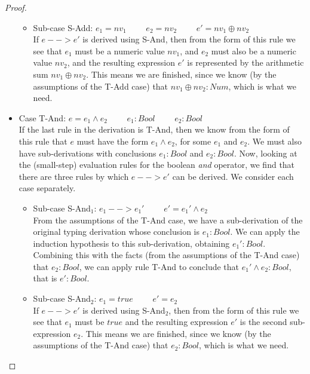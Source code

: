 \documentclass[tese,capa,english]{texufpel}
\begin{document}
\begin{proof}
\begin{itemize}
\begin{itemize}
\item Sub-case {\footnotesize\textrm{S-Add}}: $e_1 = nv_1$ \ \ \ \ $e_2 = nv_2$ \ \ \ \ $e' = nv_1 \oplus nv_2$ \vspace{4pt} \\
If $e --> e'$ is derived using {\footnotesize\textrm{S-And}}, then from the form of this rule we see that $e_1$ must be a numeric value $nv_1$, and $e_2$ must also be a numeric value $nv_2$, and the resulting expression $e'$ is represented by the arithmetic sum $nv_1 \oplus nv_2$. This means we are finished, since we know (by the assumptions of the {\footnotesize\textrm{T-Add}} case) that $nv_1 \oplus nv_2 : Num$, which is what we need.
\end{itemize}
\item Case {\footnotesize\textrm{T-And}}: $e = e_1 \wedge e_2$ \ \ \ \ $e_1 : Bool$ \ \ \ \ $e_2 : Bool$ \vspace{5pt} \\
If the last rule in the derivation is {\footnotesize\textrm{T-And}}, then we know from the form of this rule that $e$ must have the form $e_1 \wedge e_2$, for some $e_1$ and $e_2$. We must also have sub-derivations with conclusions $e_1 : Bool$ and $e_2 : Bool$. Now, looking at the (small-step) evaluation rules for the boolean \emph{and} operator, we find that there are three rules by which $e --> e'$ can be derived. We consider each case separately.
\begin{itemize}
\item Sub-case {\footnotesize\textrm{S-And$_1$}}: $e_1 --> e_1'$ \ \ \ \ $e' = e_1' \wedge e_2$ \vspace{4pt} \\
From the assumptions of the {\footnotesize\textrm{T-And}} case, we have a sub-derivation of the original typing derivation whose conclusion is $e_1 : Bool$. We can apply the induction hypothesis to this sub-derivation, obtaining $e_1' : Bool$. Combining this with the facts (from the assumptions of the {\footnotesize\textrm{T-And}} case) that $e_2 : Bool$, we can apply rule {\footnotesize\textrm{T-And}} to conclude that $e_1' \wedge e_2 : Bool$, that is $e' : Bool$.
\item Sub-case {\footnotesize\textrm{S-And$_2$}}: $e_1 = true$ \ \ \ \ $e' = e_2$ \vspace{4pt} \\
If $e --> e'$ is derived using {\footnotesize\textrm{S-And$_2$}}, then from the form of this rule we see that $e_1$ must be $true$ and the resulting expression $e'$ is the second sub-expression $e_2$. This means we are finished, since we know (by the assumptions of the {\footnotesize\textrm{T-And}} case) that $e_2 : Bool$, which is what we need.

\end{itemize}
\end{itemize}
\end{proof}
\end{document}
